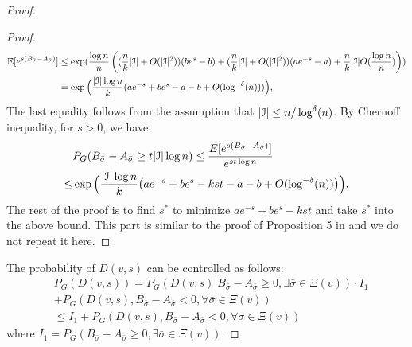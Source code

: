 \documentclass{article}
\begin{document}
\begin{proof}
\begin{proof}
	\begin{align*}
	\mathbb{E}[e^{s(B_{\bar{\sigma}}-A_{\bar{\sigma}})}] & \le
	\exp(\frac{\log n}{n}\left((\frac{n}{k}|\mathcal{I}| + O(|\mathcal{I}|^2))(be^s - b) +(\frac{n}{k} |\mathcal{I}| + O(|\mathcal{I}|^2))(ae^{-s}-a) + \frac{n}{k}|\mathcal{I}|O(\frac{\log n}{n}) \right))
	 \\
	& =
	\exp\Big(\frac{|\mathcal{I}| \log n}{k}(a e^{-s}+b e^s-a-b +
	O(\log^{-\delta}(n))) \Big),
	\end{align*}
	The last equality follows from the assumption that $ |\mathcal{I}| \le n/\log^{\delta}(n)$.
	By Chernoff inequality, for $s>0$, we have
	\begin{align*} 
	& P_G(B_{\bar{\sigma}}-A_{\bar{\sigma}}\ge t |\mathcal{I}| \log n)\le
	\frac{E[e^{s(B_{\bar{\sigma}}-A_{\bar{\sigma}})}]}{e^{st \log n}}  \\
	\le & \exp\Big(\frac{|\mathcal{I}|\log n}{k} \big(a e^{-s}+b e^s -kst -a-b
	+ O(\log^{-\delta}(n)) \big)\Big)  .
	\end{align*}
	The rest of the proof is to find $s^\ast$ to minimize $a e^{-s}+b e^s -kst$ and take $s^\ast$ into the above bound.
	This part is similar to the proof of Proposition 5 in \cite{ye2020exact} and we do not repeat it here.
	\end{proof}
The probability of $D(v, s)$ can be controlled as follows:
\begin{align*}
&P_G(D(v,s)) = 
P_G(D(v,s)| B_{\bar{\sigma}} - A_{\bar{\sigma}}   \geq 0, \exists \bar{\sigma} \in \Xi(v))
\cdot I_1 \\
&+ P_G(D(v,s) , B_{\bar{\sigma}} - A_{\bar{\sigma}}  < 0, \forall   \bar{\sigma} \in \Xi(v))
 \\
& \leq I_1
+ P_G(D(v,s), B_{\bar{\sigma}} - A_{\bar{\sigma}}    < 0, \forall \bar{\sigma} \in \Xi(v))
\end{align*}
where $I_1 = P_G( B_{\bar{\sigma}} - A_{\bar{\sigma}}  \geq 0, \exists   \bar{\sigma} \in \Xi(v) )$.


\end{proof}
\end{document}
